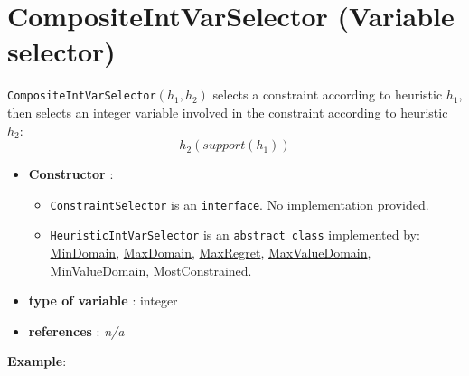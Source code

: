 \section{CompositeIntVarSelector (Variable selector)}\label{compositeintvarselector:compositeintvarselectorvarselector}\hypertarget{compositeintvarselector:compositeintvarselectorvarselector}{}
\begin{notedef}
  \texttt{CompositeIntVarSelector}$(h_1,h_2)$ selects a constraint according to heuristic $h_1$, then selects an integer variable involved in the constraint according to heuristic $h_2$:
$$h_2(support(h_1))$$
  \end{notedef}

\begin{itemize}
	\item \textbf{Constructor} :
	\begin{itemize}
\item \texttt{ConstraintSelector} is an \texttt{interface}. No implementation provided. 
\item \texttt{HeuristicIntVarSelector} is an \texttt{abstract class}  implemented by: \hyperlink{mindomain:mindomainvarselector}{MinDomain}, \hyperlink{maxdomain:maxdomainvarselector}{MaxDomain}, \hyperlink{maxregret:maxregretvarselector}{MaxRegret}, \hyperlink{maxvaldomain:maxvaldomainvarselector}{MaxValueDomain}, \hyperlink{minvaldomain:minvaldomainvarselector}{MinValueDomain}, \hyperlink{mostconstrained:mostconstrainedvarselector}{MostConstrained}. 
\end{itemize}

	\item \textbf{type of variable} : integer
	\item \textbf{references} : \emph{n/a}
\end{itemize}

\textbf{Example}:
%

